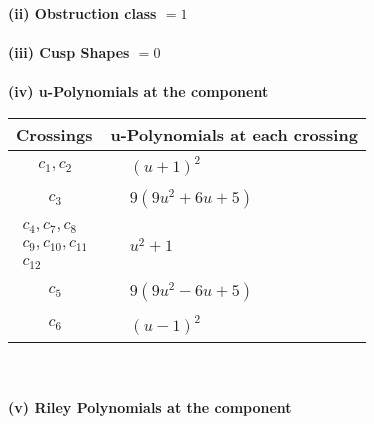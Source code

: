 \documentclass[1p]{elsarticle_modified}
\theoremstyle{definition}
\begin{document}
\flushleft \textbf{(ii) Obstruction class $= 1$}\\~\\
\flushleft \textbf{(iii) Cusp Shapes $= 0$}\\~\\
\newpage\renewcommand{\arraystretch}{1}
\flushleft \textbf{(iv) u-Polynomials at the component}\newline \\
\begin{tabular}{m{50pt}|m{274pt}}
Crossings & \hspace{64pt}u-Polynomials at each crossing \\
\hline $$\begin{aligned}c_{1},c_{2}\end{aligned}$$&$\begin{aligned}
&(u+1)^2
\end{aligned}$\\
\hline $$\begin{aligned}c_{3}\end{aligned}$$&$\begin{aligned}
&9(9 u^2+6 u+5)
\end{aligned}$\\
\hline $$\begin{aligned}c_{4},c_{7},c_{8}\\c_{9},c_{10},c_{11}\\c_{12}\end{aligned}$$&$\begin{aligned}
&u^2+1
\end{aligned}$\\
\hline $$\begin{aligned}c_{5}\end{aligned}$$&$\begin{aligned}
&9(9 u^2-6 u+5)
\end{aligned}$\\
\hline $$\begin{aligned}c_{6}\end{aligned}$$&$\begin{aligned}
&(u-1)^2
\end{aligned}$\\
\hline
\end{tabular}\\~\\
\newpage\renewcommand{\arraystretch}{1}
\flushleft \textbf{(v) Riley Polynomials at the component}\newline \\
\end{document}
